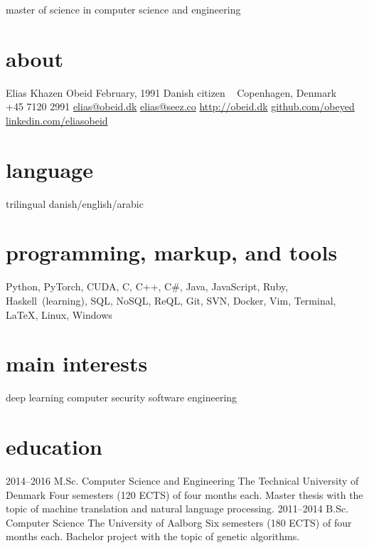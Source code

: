 \documentclass[]{friggeri-cv}
\begin{document}
    {master of science in computer science and engineering}

\begin{aside}
  \section{about}
    Elias Khazen Obeid
    February, 1991
    Danish citizen
    ~
    Copenhagen, Denmark
    ~
    +45 7120 2991
    \href{mailto:elias@obeid.dk}{elias@obeid.dk}
    \href{mailto:elias@seez.co}{elias@seez.co}
    \href{http://obeid.dk}{http://obeid.dk}
    \href{https://github.com/obeyed}{github.com/obeyed}
    \href{https://www.linkedin.com/in/eliasobeid}{linkedin.com/eliasobeid}
  \section{language}
    trilingual danish/english/arabic
  \section{programming, markup, and tools}
  	Python, PyTorch, CUDA, C, C++, C\#,
    Java, JavaScript, Ruby, Haskell~(learning),
    SQL, NoSQL, ReQL,
    Git, SVN, Docker, Vim, Terminal, \LaTeX{}, Linux, Windows
  \section{main interests}
    deep learning
    computer security
    software engineering
\end{aside}

\section{education}

\begin{entrylist}
  \entry
    {2014--2016}
    {M.Sc. {\normalfont Computer Science and Engineering}}
    {The Technical University of Denmark}
    {Four semesters (120 ECTS) of four months each.
	Master thesis with the topic of machine translation and natural language processing.}
  \entry
    {2011--2014}
    {B.Sc. {\normalfont Computer Science}}
    {The University of Aalborg}
    {Six semesters (180 ECTS) of four months each.
	Bachelor project with the topic of genetic algorithms.}
\end{entrylist}
\end{document}
